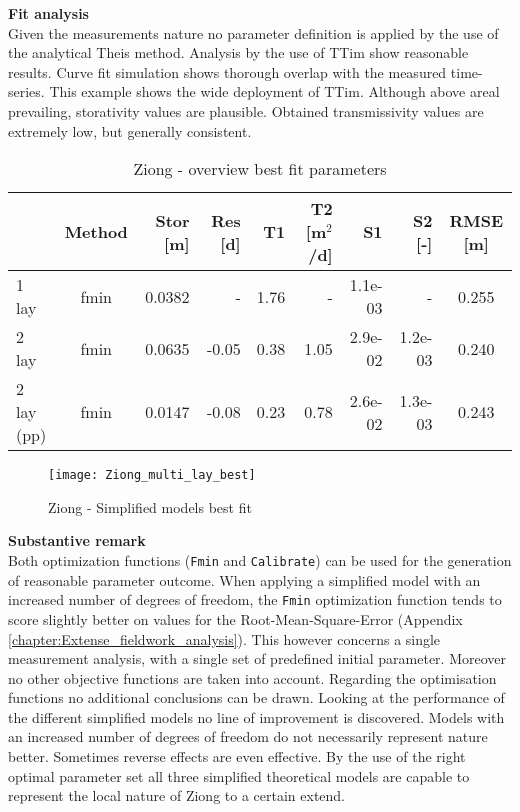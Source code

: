 \textbf{Fit analysis} \\
Given the measurements nature no parameter definition is applied by the use of the analytical Theis method. Analysis by the use of TTim show reasonable results. Curve fit simulation shows thorough overlap with the measured time-series. This example shows the wide deployment of TTim. Although above areal prevailing, storativity values are plausible. Obtained transmissivity values are extremely low, but generally consistent. \\

\begin{table}[h!]
\small
\centering
\caption{Ziong - overview best fit parameters}
\label{tab:Ziong_table}
\begin{tabular}{l|c|r|r|rr|rr|c}
\hline 
\textbf{}       & \textbf{Method} & \textbf{Stor [m]} & \textbf{Res [d]} & \textbf{T1}  & \textbf{T2   [m$^2$/d]}  & \textbf{S1}  & \textbf{S2 [-]}  & \textbf{RMSE [m]} \\ \hline \hline
1 lay                     & fmin             & 0.0382        & -            & 1.76      & -         & 1.1e-03    & -          & 0.255 \\
2 lay                     & fmin             & 0.0635        & -0.05        & 0.38      & 1.05      & 2.9e-02    & 1.2e-03    & 0.240 \\
2 lay (pp)                & fmin             & 0.0147        & -0.08        & 0.23      & 0.78      & 2.6e-02    & 1.3e-03    & 0.243 \\ \hline    
\end{tabular}
\end{table}

\begin{figure}[h!]
 \centering
 \texttt{[image: Ziong\_multi\_lay\_best]}
 \captionsetup{justification=centering} 
 \caption{Ziong - Simplified models best fit}
 \label{fig:Ziong_best}
\end{figure}

\textbf{Substantive remark} \\
Both optimization functions (\texttt{Fmin} and \texttt{Calibrate}) can be used for the generation of reasonable parameter outcome. When applying a simplified model with an increased number of degrees of freedom, the \texttt{Fmin} optimization function tends to score slightly better on values for the Root-Mean-Square-Error (Appendix \ref{chapter:Extense_fieldwork_analysis}). This however concerns a single measurement analysis, with a single set of predefined initial parameter. Moreover no other objective functions are taken into account. Regarding the optimisation functions no additional conclusions can be drawn. Looking at the performance of the different simplified models no line of improvement is discovered. Models with an  increased number of degrees of freedom do not necessarily represent nature better. Sometimes reverse effects are even effective. By the use of the right optimal parameter set all three simplified theoretical models are capable to represent the local nature of Ziong to a certain extend. 


